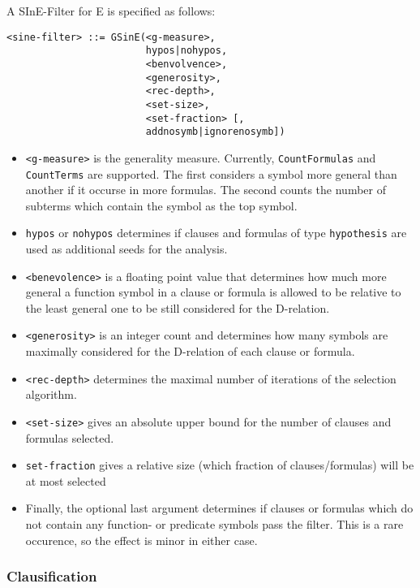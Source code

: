 \documentclass{report}
\begin{document}
\begin{itemize}
  A SInE-Filter for E is specified as follows:
\begin{verbatim}
<sine-filter> ::= GSinE(<g-measure>,
                        hypos|nohypos,
                        <benvolvence>,
                        <generosity>,
                        <rec-depth>,
                        <set-size>,
                        <set-fraction> [,
                        addnosymb|ignorenosymb])
\end{verbatim}
  \begin{itemize}
  \item \texttt{<g-measure>} is the generality measure. Currently,
    \texttt{CountFormulas} and \texttt{CountTerms} are supported. The
    first considers a symbol more general than another if it occurse
    in more formulas. The second counts the number of subterms which
    contain the symbol as the top symbol.
  \item \texttt{hypos} or \texttt{nohypos} determines if clauses and
    formulas of type \texttt{hypothesis} are used as additional seeds
    for the analysis.
  \item \texttt{<benevolence>} is a floating point value that determines
    how much more general a function symbol in a clause or formula is
    allowed to be relative to the least general one to be still
    considered for the D-relation.
  \item \texttt{<generosity>} is an integer count and determines how
    many symbols are maximally considered for the D-relation of each
    clause or formula.
  \item \texttt{<rec-depth>} determines the maximal number of
    iterations of the selection algorithm.
  \item \texttt{<set-size>} gives an absolute upper bound for the
    number of clauses and formulas selected.
  \item \texttt{set-fraction} gives a relative size (which fraction
    of clauses/formulas) will be at most selected
  \item Finally, the optional last argument determines if clauses or
    formulas which do not contain any function- or predicate symbols
    pass the filter. This is a rare occurence, so the effect is minor
    in either case.
  \end{itemize}
\end{itemize}

\subsubsection{Clausification}
\label{sec:cnf}
\end{document}
